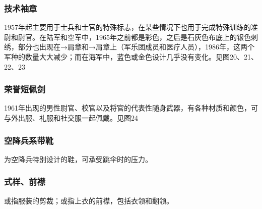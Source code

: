 \subsubsection*{技术袖章}%

1957年起主要用于士兵和士官的特殊标志，在某些情况下也用于完成特殊训练的准尉和尉官。在陆军和空军中，1965年之前都是彩色，之后是石灰色布底上的银色刺绣，部分也出现在→肩章和→肩章上（军乐团成员和医疗人员），1986年，这两个军种的数量大大减少；而在海军中，蓝色或金色设计几乎没有变化。见图20、21、22、23

\subsubsection*{荣誉短佩剑}%

1961年出现的男性尉官、校官以及将官的代表性随身武器，有各种材质和颜色，可与外出服、礼服和社交服一起佩戴。见图24

\subsubsection*{空降兵系带靴}%

为空降兵特别设计的鞋，可承受跳伞时的压力。

\subsubsection*{式样、前襟}%

或指服装的剪裁；或指上衣的前襟，包括衣领和翻领。


